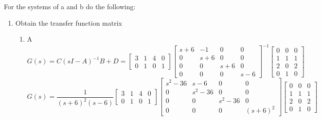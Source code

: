 \item For the systems of a and b do the following:
  \begin{enumerate}
  \item Obtain the transfer function matrix \\
    \begin{enumerate}
    \item A\\
      \begin{equation}
        G(s) =
        C(sI-A)^{-1}B + D =
        \begin{bmatrix}
          3 & 1 & 4 & 0 \\
          0 & 1 & 0 & 1 
        \end{bmatrix}
        \begin{bmatrix}
          s + 6 & -1 & 0 & 0 \\
          0 & s + 6 & 0 & 0 \\
          0 & 0 & s + 6 & 0 \\
          0 & 0 & 0 & s - 6
        \end{bmatrix}^{-1}
        \begin{bmatrix}
          0 & 0 & 0 \\
          1 & 1 & 1 \\
          2 & 0 & 2 \\
          0 & 1 & 0
        \end{bmatrix}
      \end{equation}
      \begin{equation}
        G(s) =
        \frac 1 {(s+6)^2(s-6)}
        \begin{bmatrix}
          3 & 1 & 4 & 0 \\
          0 & 1 & 0 & 1 
        \end{bmatrix}
        \begin{bmatrix}
          s^2 - 36 & s - 6 & 0 & 0 \\
          0 & s^2 - 36 & 0 & 0 \\
          0 & 0 & s^2 - 36 & 0 \\
          0 & 0 & 0 & (s + 6)^2
        \end{bmatrix}
        \begin{bmatrix}
          0 & 0 & 0 \\
          1 & 1 & 1 \\
          2 & 0 & 2 \\
          0 & 1 & 0
        \end{bmatrix}
      \end{equation}

\end{enumerate}
\end{enumerate}
